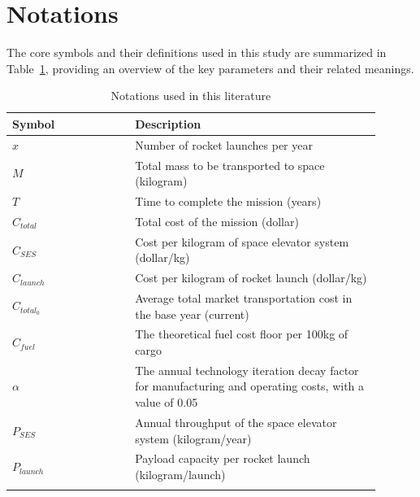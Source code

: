 \section{Notations}
\setlength{\parindent}{2em} %

The core symbols and their definitions used in this study are summarized in Table~\ref{table:notations}, providing an overview of the key parameters and their related meanings.

\begin{table}[ht]
\centering %
\caption{Notations used in this literature}
\renewcommand{\arraystretch}{1.5}

\begin{tabular}{
>{\centering\bfseries\boldmath\arraybackslash}p{0.3\linewidth} |
>{\centering\arraybackslash}p{0.6\linewidth} 
}
\cline{1-2}
\textbf{Symbol} & \textbf{Description} \\ 
\cline{1-2}
\rowcolor{gray!15}
$x$          & Number of rocket launches per year \\ \cline{1-2}
$M$          & Total mass to be transported to space (kilogram) \\ \cline{1-2}
\rowcolor{gray!15}
$T$          & Time to complete the mission (years) \\ \cline{1-2}
$C_{total}$  & Total cost of the mission (dollar) \\ \cline{1-2}
\rowcolor{gray!15}
$C_{SES}$    & Cost per kilogram of space elevator system (dollar/kg) \\ \cline{1-2}
$C_{launch}$ & Cost per kilogram of rocket launch (dollar/kg) \\ \cline{1-2}
\rowcolor{gray!15}
$C_{total_0}$& Average total market transportation cost in the base year (current) \\ \cline{1-2}
$C_{fuel}$   & The theoretical fuel cost floor per 100kg of cargo \\ \cline{1-2}
\rowcolor{gray!15}
$\alpha$     &The annual technology iteration decay factor for manufacturing and operating costs, with a value of 0.05 \\ \cline{1-2}
$P_{SES}$    & Annual throughput of the space elevator system (kilogram/year) \\ \cline{1-2}
\rowcolor{gray!15}
$P_{launch}$ & Payload capacity per rocket launch (kilogram/launch) \\ \cline{1-2}


\end{tabular}
\label{table:notations}
\end{table}




